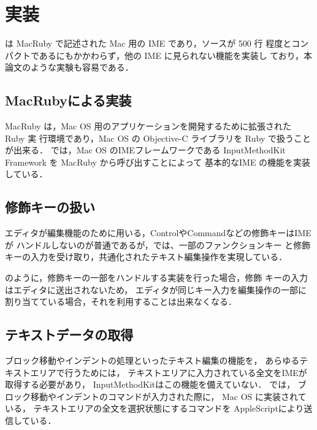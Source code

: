\chapter{実装}

{\system} は MacRuby で記述された Mac 用の IME であり，ソースが 500 行
程度とコンパクトであるにもかかわらず，他の IME に見られない機能を実装し
ており，本論文のような実験も容易である．

\section{MacRubyによる実装}

MacRuby は，Mac OS 用のアプリケーションを開発するために拡張された Ruby 実
行環境であり，Mac OS の Objective-C ライブラリを Ruby で扱うことが出来る．
%
{\system} では，Mac OS のIMEフレームワークである
InputMethodKit Framework を MacRuby から呼び出すことによって
基本的なIME の機能を実装している．

\section{修飾キーの扱い}

エディタが編集機能のために用いる，ControlやCommandなどの修飾キーはIMEが
ハンドルしないのが普通であるが，{\system}では、一部のファンクションキー
と修飾キーの入力を受け取り，共通化されたテキスト編集操作を実現している．

{\system} のように，修飾キーの一部をハンドルする実装を行った場合，修飾
キーの入力はエディタに送出されないため，
エディタが同じキー入力を編集操作の一部に割り当てている場合，それを利用することは出来なくなる．

\section{テキストデータの取得}

ブロック移動やインデントの処理といったテキスト編集の機能を，
あらゆるテキストエリアで行うためには，
テキストエリアに入力されている全文をIMEが取得する必要があり，
InputMethodKitはこの機能を備えていない．
%
{\system} では，
ブロック移動やインデントのコマンドが入力された際に，
Mac OS に実装されている，
テキストエリアの全文を選択状態にするコマンドを
AppleScriptにより送信している．

